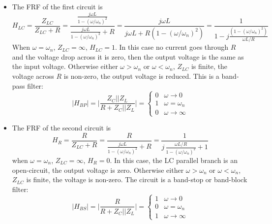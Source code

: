 \documentclass{article}
\begin{document}
\begin{itemize}
\item The FRF of the first circuit is
  \begin{equation}
    H_{LC}=\frac{Z_{LC}}{Z_{LC}+R}=\frac{\frac{j\omega L}{1-(\omega/\omega_n)^2}}{
      \frac{j\omega L}{1-(\omega/\omega_n)^2 } +R}
    =\frac{j\omega L}{j\omega L+R(1-(\omega/\omega_n)^2)}
    =\frac{1}{1-j\frac{(1-(\omega/\omega_n)^2)}{\omega L/R}}
  \end{equation}
  When $\omega=\omega_n$, $Z_{LC}=\infty$, $H_{LC}=1$. In this case
  no current goes through $R$ and the voltage drop across it is zero, 
  then the output voltage is the same as the input voltage. Otherwise 
  either $\omega>\omega_n$ or $\omega<\omega_n$, $Z_{LC}$ is finite, the 
  voltage across $R$ is non-zero, the output voltage is reduced. This is
  a band-pass filter:
  \begin{equation} 
    |H_{BP}|=\bigg|\frac{Z_C||Z_L}{R+Z_C||Z_L}\bigg|
    =\left\{\begin{array}{cc}0&\omega\rightarrow 0\\
    1&\omega=\omega_n\\ 0&\omega\rightarrow\infty\end{array}\right.
  \end{equation}

\item The FRF of the second circuit is
  \begin{equation}
    H_R=\frac{R}{Z_{LC}+R}=\frac{R}{\frac{j\omega L}{1-(\omega/\omega_n)^2}+R}
    =\frac{1}{j\,\frac{\omega L/R}{1-(\omega/\omega_n)^2 }+1}
  \end{equation}
  when $\omega=\omega_n$, $Z_{LC}=\infty$, $H_R=0$. In this case,
  the LC parallel branch is an open-circuit, the output voltage is 
  zero. Otherwise either $\omega>\omega_n$ or $\omega<\omega_n$, 
  $Z_{LC}$ is finite, the voltage is non-zero. The circuit is a 
  band-stop or band-block filter:
  \begin{equation} 
    |H_{BS}|=\bigg|\frac{R}{R+Z_C||Z_L}\bigg|
    =\left\{\begin{array}{cc}1&\omega\rightarrow 0\\
    0&\omega=\omega_n\\ 1&\omega\rightarrow\infty\end{array}\right.
  \end{equation}

\end{itemize}

\end{document}
